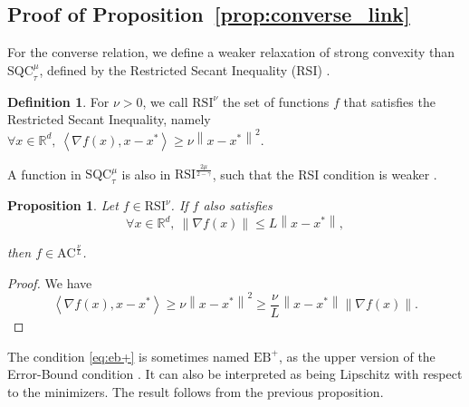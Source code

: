\documentclass{article}
\def\R{{\mathbb{R}}}
\def\rsi{{\text{RSI}^\nu}}
\newcommand{\norm}[1]{\left\lVert#1\right\rVert}
\newcommand{\dotprod}[1]{\left< #1\right>}
\newcommand{\sqc}{\text{SQC}_{\tau}^{\mu}}
\newcommand{\acf}[1]{\text{AC}^{#1}}
\newcommand{\rsif}[1]{\text{RSI}^{#1}}
\theoremstyle{plain}
\newtheorem{proposition}[theorem]{Proposition}
\theoremstyle{definition}
\newtheorem{definition}[theorem]{Definition}
\theoremstyle{remark}
\begin{document}
 \subsection{Proof of Proposition~\ref{prop:converse_link}}\label{app:prop:converse}
 For the converse relation, we define a weaker relaxation of strong convexity than $\sqc$, defined by the Restricted Secant Inequality (RSI) \cite{zhang2013gradient}.
\begin{definition}
   For $\nu>0$, we call $\rsi$ the set of functions $f$ that satisfies the Restricted Secant Inequality, namely $\forall x \in \R^d,~ \dotprod{\nabla f(x),x-x^\ast} \ge \nu \norm{x-x^\ast}^2.$
\end{definition}
A function in $\sqc$ is also in $\rsif{\frac{2\mu}{2-\gamma}}$, such that the RSI condition is weaker \cite{hermant2024study}. 
\begin{proposition}
    Let $f\in\rsi$. If $f$ also satisfies
    \begin{equation}\label{eq:eb+}
         \forall x \in \R^d,~ \norm{\nabla f(x)}\le L\norm{x-x^\ast},
    \end{equation}

    then $f \in \acf{\frac{\nu}{L}}$.
\end{proposition}
\begin{proof}
    We have \[\dotprod{\nabla f(x),x-x^\ast} \ge \nu \norm{x-x^\ast}^2 \ge \frac{\nu}{L}\norm{x-x^\ast}\norm{\nabla f(x)}.\]
\end{proof}
The condition \eqref{eq:eb+} is sometimes named $\text{EB}^+$, as the upper version of the Error-Bound condition \cite{guille2021study}. It can also be interpreted as being Lipschitz with respect to the minimizers. The result follows from the previous proposition.
\end{document}
